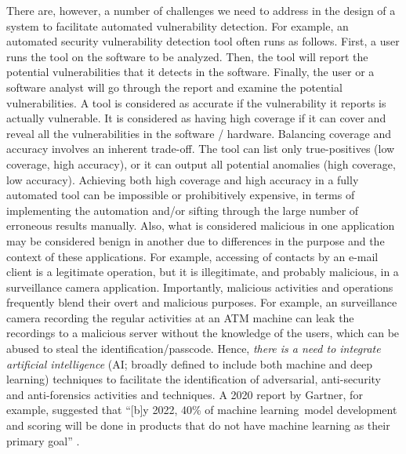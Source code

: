 
There are, however, a number of challenges we need to address in the
design of a system to facilitate automated vulnerability detection.
For example, an automated security vulnerability detection tool often
runs as follows. First, a user runs the tool on the software to be
analyzed. Then, the tool will report the potential vulnerabilities
that it detects in the software. Finally, the user or a software
analyst will go through the report and examine the potential
vulnerabilities. A tool is considered as accurate if the vulnerability
it reports is actually vulnerable. It is considered as having high
coverage if it can cover and reveal all the vulnerabilities in the
software / hardware. Balancing coverage and accuracy involves an
inherent trade-off. The tool can list only true-positives (low
coverage, high accuracy), or it can output all potential anomalies
(high coverage, low accuracy). Achieving both high coverage and high
accuracy in a fully automated tool can be impossible or prohibitively
expensive, in terms of implementing the automation and/or sifting
through the large number of erroneous results manually.
Also, what is considered malicious in one application may be
considered benign in another due to differences in the purpose and the
context of these applications. For example, accessing of contacts by
an e-mail client is a legitimate operation, but it is illegitimate,
and probably malicious, in a surveillance camera
application. Importantly, malicious activities and operations
frequently blend their overt and malicious purposes. For example, an
surveillance camera recording the regular activities at an ATM machine
can leak the recordings to a malicious server without the knowledge of
the users, which can be abused to steal the
identification/passcode. Hence, {\em there is a need to integrate
artificial intelligence} (AI; broadly defined to include both machine
and deep learning) techniques to facilitate the identification of
adversarial, anti-security and anti-forensics activities and
techniques. A 2020 report by Gartner, for example, suggested that
``[b]y 2022, 40\% of machine learning~model development and scoring
will be done in products that do not have machine learning as their
primary goal'' \cite{RichardsonGartner2020}.

